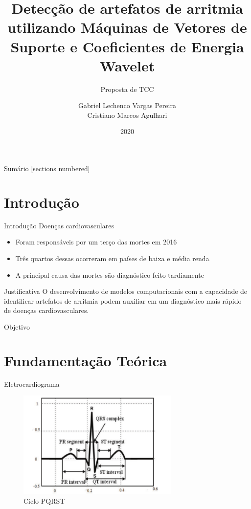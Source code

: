 \documentclass[10pt]{beamer}
\title{Detecção de artefatos de arritmia utilizando Máquinas de Vetores de Suporte e Coeficientes de Energia Wavelet}
\subtitle{Proposta de TCC}
\date{2020}
\author{Gabriel Lechenco Vargas Pereira \\
Cristiano Marcos Agulhari}
\institute{Universidade Tecnológica Federal do Paraná - UTFPR}
\begin{document}

\maketitle

\begin{frame}{Sumário}
  [sections numbered]
  \tableofcontents[hideallsubsections]
\end{frame}

\section{Introdução}

\begin{frame}{Introdução}
    Doenças cardiovasculares
    \begin{itemize}
        \item Foram responsáveis por um terço das mortes em 2016
        \item Três quartos dessas ocorreram em países de baixa e média renda
        \item A principal causa das mortes são diagnóstico feito tardiamente
    \end{itemize}
\end{frame}

\begin{frame} {Justificativa}
  O desenvolvimento de modelos computacionais com a capacidade de identificar 
  artefatos de arritmia podem auxiliar em um diagnóstico mais rápido de doenças 
  cardiovasculares.
\end{frame}

\begin{frame}{Objetivo}

  

\end{frame}

\section{Fundamentação Teórica}

\begin{frame}{Eletrocardiograma}
    \begin{figure}[]
      \centering
      \includegraphics[width=8cm]{images/pqrst.png}
      \caption{Ciclo PQRST \cite{faziludeen_ecg_2013}}
      \label{fig:pqrst}
    \end{figure}
\end{frame}
\end{document}
